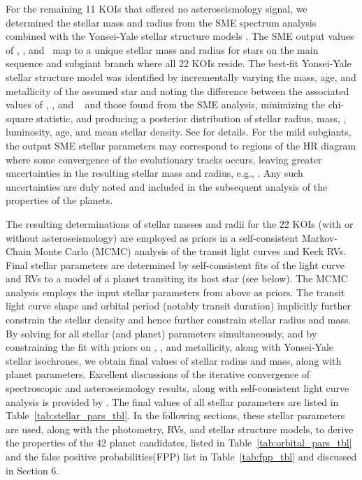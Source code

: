 \documentclass{emulateapj}
\begin{document}
For the remaining 11 KOIs that offered no asteroseismology signal, we
 determined the stellar mass and radius from the SME spectrum analysis
 combined with the Yonsei-Yale stellar structure models \citep{Yi2001,
 Demarque04}. The SME output values of \teff, \logg, and \feh~map to
 a unique stellar mass and radius for stars on the main sequence and
 subgiant branch where all 22 KOIs reside. The best-fit Yonsei-Yale
 stellar structure model was identified by incrementally varying the
 mass, age, and metallicity of the assumed star and noting the
 difference between the associated values of \teff, \logg, and \feh~
 and those found from the SME analysis, minimizing the chi-square
 statistic, and producing a posterior distribution of stellar radius, mass,
 \feh, luminosity, age, and mean stellar density. See
 \cite{Borucki2013} for details.  For the mild subgiants, the output
 SME stellar parameters may correspond to regions of the HR diagram
 where some convergence of the evolutionary tracks occurs, leaving
 greater uncertainties in the resulting stellar mass and radius, e.g.,
 \citep{Batalha2011}.  Any such uncertainties are duly noted and
 included in the subsequent analysis of the properties of the planets.

The resulting determinations of stellar masses and radii for the 22
 KOIs (with or without asteroseismology) are employed as priors in a
 self-consistent Markov-Chain Monte Carlo (MCMC) analysis of the \ek
 transit light curves and Keck RVs.  Final stellar parameters are
 determined by self-consistent fits of the \ek light curve and RVs to a
 model of a planet transiting its host star (see below).  The MCMC analysis
 employs the input stellar parameters from above as priors.  The \ek
 transit light curve shape and orbital period (notably transit
 duration) implicitly further constrain the stellar density and hence
 further constrain stellar radius and mass.  By solving for all
 stellar (and planet) parameters simultaneously, and by constraining
 the fit with priors on \teff, \logg, and metallicity, along with
 Yonsei-Yale stellar isochrones, we obtain final values of stellar
 radius and mass, along with planet parameters.  Excellent discussions
 of the iterative convergence of spectroscopic and asteroseismology
 results, along with self-consistent light curve analysis is provided
 by \cite{Torres2012, Gilliland2013, Borucki2013}.   The final values
of all stellar parameters are listed in Table~\ref{tab:stellar_pars_tbl}. 
In the following
sections, these stellar parameters are used, along with the \ek
photometry, RVs, and stellar structure models, to derive the
properties of the 42 planet candidates, listed in Table~\ref{tab:orbital_pars_tbl}
and the false positive probabilities(FPP) list in Table~\ref{tab:fpp_tbl}
and discussed in Section 6.
\end{document}
